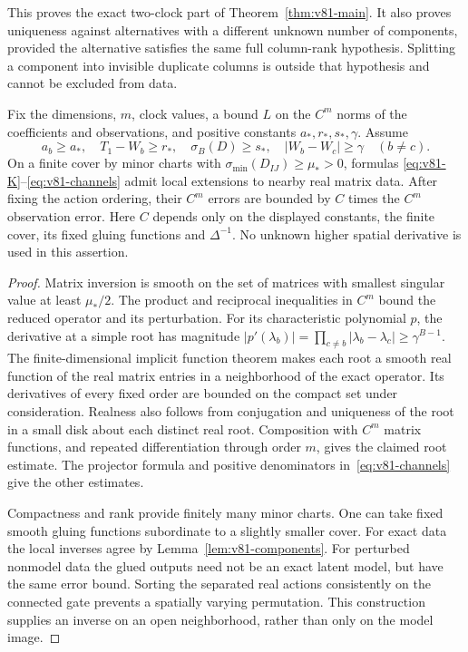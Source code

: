 This proves the exact two-clock part of Theorem~\ref{thm:v81-main}.
It also proves uniqueness against alternatives with a different unknown
number of components, provided the alternative satisfies the same full
column-rank hypothesis.  Splitting a component into invisible duplicate
columns is outside that hypothesis and cannot be excluded from data.

\begin{proposition}\label{prop:v81-stability}
Fix the dimensions, $m$, clock values, a bound $L$ on the $C^m$ norms
of the coefficients and observations, and positive constants
$a_*,r_*,s_*,\gamma$.  Assume
\[
 a_b\ge a_*,\quad T_1-W_b\ge r_*,\quad
 \sigma_B(D)\ge s_*,\quad |W_b-W_c|\ge\gamma\quad(b\ne c).
\]
On a finite cover by minor charts with
$\sigma_{\min}(D_{IJ})\ge\mu_*>0$, formulas
\eqref{eq:v81-K}--\eqref{eq:v81-channels} admit local extensions to
nearby real matrix data.  After fixing the action ordering, their
$C^m$ errors are bounded by $C$ times the $C^m$ observation error.
Here $C$ depends only on the displayed constants, the finite cover,
its fixed gluing functions and $\Delta^{-1}$.  No unknown higher
spatial derivative is used in this assertion.
\end{proposition}
\begin{proof}
Matrix inversion is smooth on the set of matrices with smallest
singular value at least $\mu_*/2$.  The product and reciprocal
inequalities in $C^m$ bound the reduced operator and its perturbation.
For its characteristic polynomial $p$, the derivative at a simple root
has magnitude
$|p'(\lambda_b)|=\prod_{c\ne b}|\lambda_b-\lambda_c|
\ge\gamma^{B-1}$.  The finite-dimensional implicit function theorem
makes each root a smooth real function of the real matrix entries in
a neighborhood of the exact operator.  Its derivatives of every fixed
order are bounded on the compact set under consideration.  Realness
also follows from conjugation and uniqueness of the root in a small
disk about each distinct real root.  Composition with $C^m$ matrix
functions, and repeated differentiation through order $m$, gives the
claimed root estimate.  The projector formula and positive denominators
in~\eqref{eq:v81-channels} give the other estimates.

Compactness and rank provide finitely many minor charts.  One can take
fixed smooth gluing functions subordinate to a slightly smaller cover.
For exact data the local inverses agree by
Lemma~\ref{lem:v81-components}.  For perturbed nonmodel data the glued
outputs need not be an exact latent model, but have the same error bound.
Sorting the separated real actions consistently on the connected gate
prevents a spatially varying permutation.  This construction supplies an
inverse on an open neighborhood, rather than only on the model image.
\end{proof}


